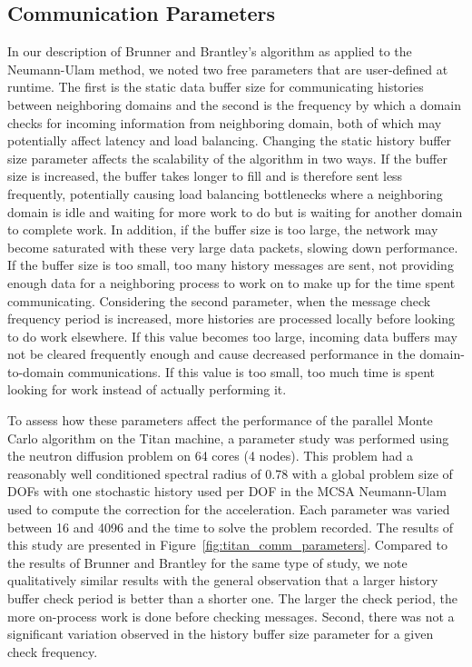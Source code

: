 \subsection{Communication Parameters}
\label{subsec:comm_parameters}

In our description of Brunner and Brantley's algorithm as applied to
the Neumann-Ulam method, we noted two free parameters that are
user-defined at runtime. The first is the static data buffer size for
communicating histories between neighboring domains and the second is
the frequency by which a domain checks for incoming information from
neighboring domain, both of which may potentially affect latency and
load balancing. Changing the static history buffer size parameter
affects the scalability of the algorithm in two ways. If the buffer
size is increased, the buffer takes longer to fill and is therefore
sent less frequently, potentially causing load balancing bottlenecks
where a neighboring domain is idle and waiting for more work to do but
is waiting for another domain to complete work. In addition, if the
buffer size is too large, the network may become saturated with these
very large data packets, slowing down performance. If the buffer size
is too small, too many history messages are sent, not providing enough
data for a neighboring process to work on to make up for the time
spent communicating. Considering the second parameter, when the
message check frequency period is increased, more histories are
processed locally before looking to do work elsewhere. If this value
becomes too large, incoming data buffers may not be cleared frequently
enough and cause decreased performance in the domain-to-domain
communications. If this value is too small, too much time is spent
looking for work instead of actually performing it.

To assess how these parameters affect the performance of the parallel
Monte Carlo algorithm on the Titan machine, a parameter study was
performed using the neutron diffusion problem on 64 cores (4
nodes). This problem had a reasonably well conditioned spectral radius
of 0.78 with a global problem size of  DOFs with one
stochastic history used per DOF in the MCSA Neumann-Ulam used to
compute the correction for the acceleration. Each parameter was varied
between 16 and 4096 and the time to solve the problem recorded. The
results of this study are presented in
Figure~\ref{fig:titan_comm_parameters}. Compared to the results of
Brunner and Brantley for the same type of study, we note qualitatively
similar results with the general observation that a larger history
buffer check period is better than a shorter one. The larger the check
period, the more on-process work is done before checking
messages. Second, there was not a significant variation observed in
the history buffer size parameter for a given check frequency.

